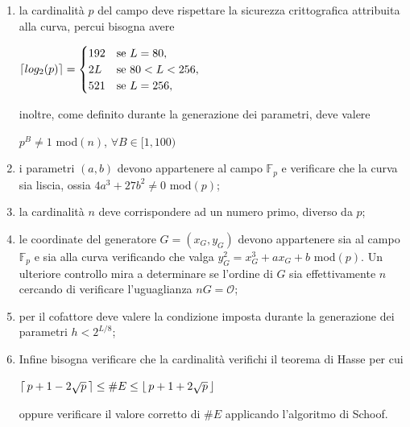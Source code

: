 \documentclass[a4paper,12pt]{tesiinfo}
\DeclarePairedDelimiter\ceil{\lceil}{\rceil}
\DeclarePairedDelimiter\floor{\lfloor}{\rfloor}
\begin{document}
\begin{enumerate}
 \item la cardinalit\`a $p$ del campo deve rispettare la sicurezza crittografica attribuita alla curva, percui bisogna avere 
 \begin{center}$
 \ceil{log_2(p)}=
 \begin{cases}
  192 & \text{se }L=80,\\
  2L & \text{se }80<L<256,\\
  521 & \text{se }L=256,\\
 \end{cases}$
 \end{center}
 inoltre, come definito durante la generazione dei parametri, deve valere \begin{center}
 $p^B \ne 1$ mod$(n)$, $\forall B\in [1, 100)$
 \end{center} 
 \item i parametri $(a, b)$ devono appartenere al campo $\mathbb{F}_p$ e verificare che la curva sia liscia, ossia $4a^3+27b^2 \ne 0$ mod$(p)$;
 \item la cardinalit\`a $n$ deve corrispondere ad un numero primo, diverso da $p$;
 \item le coordinate del generatore $G=(x_G, y_G)$ devono appartenere sia al campo $\mathbb{F}_p$ e sia alla curva verificando che valga $y_G^2=x_G^3+ax_G+b$ mod$(p)$. Un ulteriore controllo mira a determinare se l'ordine di $G$ sia effettivamente $n$ cercando di verificare l'uguaglianza $nG=\mathcal{O}$;
 \item per il cofattore deve valere la condizione imposta durante la generazione dei parametri $h<2^{L / 8}$;
 \item Infine bisogna verificare che la cardinalit\`a verifichi il teorema di Hasse per cui \begin{center}
 $\ceil{\, p+1-2\sqrt{p}\,} \leq \#E \leq \floor{\,p+1+2\sqrt{p}\,}$
 \end{center}
 oppure verificare il valore corretto di $\#E$ applicando l'algoritmo di Schoof.
\end{enumerate}
%
%
%
%
%
%
%
%
%
\end{document}
